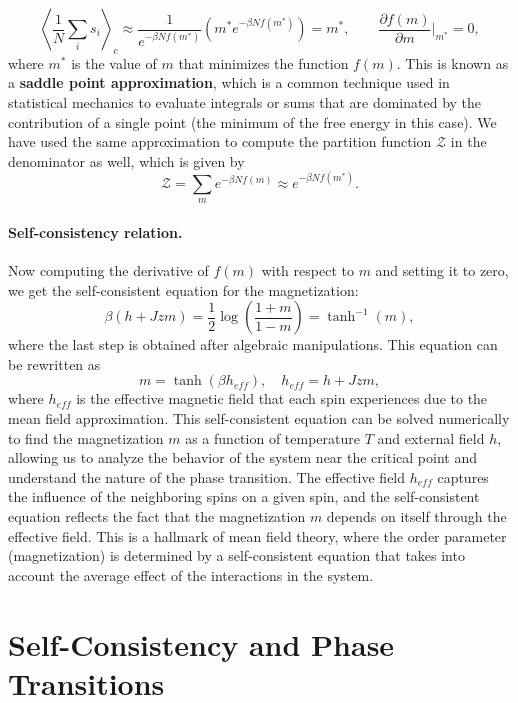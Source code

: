 \[
    \left\langle \frac{1}{N} \sum_{i} s_i \right\rangle_c \approx \frac{1}{e^{-\beta N f(m^*)}} \left( m^* e^{-\beta N f(m^*)} \right) = m^*, \qquad \frac{\partial f(m)}{\partial m}\bigg|_{m^*} = 0,
\]
where \(m^*\) is the value of \(m\) that minimizes the function \(f(m)\). This is known as a \textbf{saddle point approximation}, which is a common technique used in statistical mechanics to evaluate integrals or sums that are dominated by the contribution of a single point (the minimum of the free energy in this case). We have used the same approximation to compute the partition function \(\mathcal{Z}\) in the denominator as well, which is given by
\[
    \mathcal{Z} = \sum_{m} e^{-\beta N f(m)} \approx e^{-\beta N f(m^*)}.
\]

\paragraph{Self-consistency relation.}
Now computing the derivative of \(f(m)\) with respect to \(m\) and setting it to zero, we get the self-consistent equation for the magnetization:
\[
    \beta(h + J z m) = \frac{1}{2} \log\left( \frac{1+m}{1-m} \right) = \tanh^{-1}(m),
\]
where the last step is obtained after algebraic manipulations. This equation can be rewritten as
\[
    m = \tanh\left( \beta h_{eff} \right), \quad h_{eff} = h + J z m,
\]
where \(h_{eff}\) is the effective magnetic field that each spin experiences due to the mean field approximation. This self-consistent equation can be solved numerically to find the magnetization \(m\) as a function of temperature \(T\) and external field \(h\), allowing us to analyze the behavior of the system near the critical point and understand the nature of the phase transition. The effective field \(h_{eff}\) captures the influence of the neighboring spins on a given spin, and the self-consistent equation reflects the fact that the magnetization \(m\) depends on itself through the effective field. This is a hallmark of mean field theory, where the order parameter (magnetization) is determined by a self-consistent equation that takes into account the average effect of the interactions in the system.


\section{Self-Consistency and Phase Transitions}

